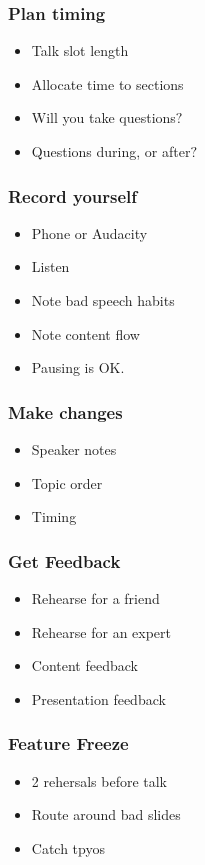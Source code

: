 \documentclass{beamer}
\begin{document}
\begin{frame}[fragile]
\tableofcontents[currentsection]
\end{frame}


\begin{frame}[fragile]
\frametitle{Plan timing}
\begin{itemize}[<+(1)->]
\item Talk slot length
\item Allocate time to sections
\item Will you take questions$?$
\item Questions during, or after$?$
\end{itemize}
\end{frame}

\begin{frame}[fragile]
\frametitle{Record yourself}
\begin{itemize}[<+(1)->]
\item Phone or Audacity
\item Listen
\item Note bad speech habits
\item Note content flow
\item Pausing is OK.
\end{itemize}
\end{frame}

\begin{frame}[fragile]
\frametitle{Make changes}
\begin{itemize}[<+(1)->]
\item Speaker notes
\item Topic order
\item Timing
\end{itemize}
\end{frame}

\begin{frame}[fragile]
\frametitle{Get Feedback}
\begin{itemize}[<+(1)->]
\item Rehearse for a friend
\item Rehearse for an expert
\item Content feedback
\item Presentation feedback
\end{itemize}
\end{frame}

\begin{frame}[fragile]
\frametitle{Feature Freeze}
\begin{itemize}[<+(1)->]
\item 2 rehersals before talk
\item Route around bad slides
\item Catch tpyos
\end{itemize}
\end{frame}
\end{document}

